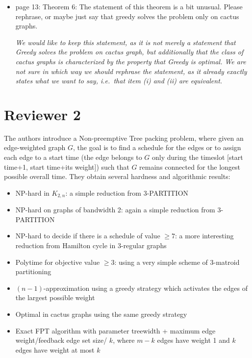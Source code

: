 \documentclass[11pt,a4paper]{article}
\begin{document}
\begin{itemize}
\item page 13: Theorem 6: The statement of this theorem is a bit unusual. Please rephrase, or maybe just say that greedy solves the problem only on cactus graphs.

\textit{We would like to keep this statement, as it is not merely a statement that Greedy solves the problem on cactus graph, but additionally that the class of cactus graphs is characterized by the property that Greedy is optimal. 
We are not sure in which way we should rephrase the statement, as it already exactly states what we want to say, i.e.\ that item (i) and (ii) are equivalent.}

\end{itemize}


\section*{Reviewer 2}

The authors introduce a Non-preemptive Tree packing problem, where given an edge-weighted graph $G$, the goal is to find a schedule for the edges or to assign each edge to a start time (the edge belongs to $G$ only during the timeslot [start time+1, start time+its weight]) such that $G$ remains connected for the longest possible overall time. They obtain several hardness and algorithmic results:

\begin{itemize}
\item NP-hard in $K_{2,n}$: a simple reduction from 3-PARTITION
\item NP-hard on graphs of bandwidth 2: again a simple reduction from 3-PARTITION
\item NP-hard to decide if there is a schedule of value $\geq 7$: a more interesting reduction from Hamilton cycle in 3-regular graphs

\item Polytime for objective value $\geq 3$: using a very simple scheme of 3-matroid partitioning    
\item $(n-1)$-approximation using a greedy strategy which activates the edges of the largest possible weight
\item Optimal in cactus graphs using the same greedy strategy
\item Exact FPT algorithm with parameter treewidth + maximum edge weight/feedback edge set size/ $k$, where $m-k$ edges have weight 1 and $k$ edges have weight at most $k$
\end{itemize}
\end{document}
